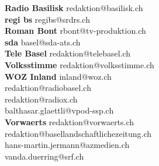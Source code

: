 \documentclass{scrartcl}
\begin{document}
\textbf{Radio Basilisk } redaktion@basilisk.ch\\
\textbf{regi bs } regibs@srdrs.ch\\
\textbf{Roman Bont } rbont@tv-produktion.ch\\
\textbf{sda } basel@sda-ats.ch\\
\textbf{Tele Basel } redaktion@telebasel.ch\\
\textbf{Volksstimme } redaktion@volksstimme.ch\\
\textbf{WOZ Inland } inland@woz.ch\\
\textbf{} redaktion@radiobasel.ch\\
\textbf{} redaktion@radiox.ch\\
\textbf{} balthasar.glaettli@vpod-ssp.ch\\
\textbf{Vorwaerts } redaktion@vorwaerts.ch\\
\textbf{} redaktion@basellandschaftlichezeitung.ch\\
\textbf{} hans-martin.jermann@azmedien.ch\\
\textbf{} vanda.duerring@srf.ch\\
\end{document}
